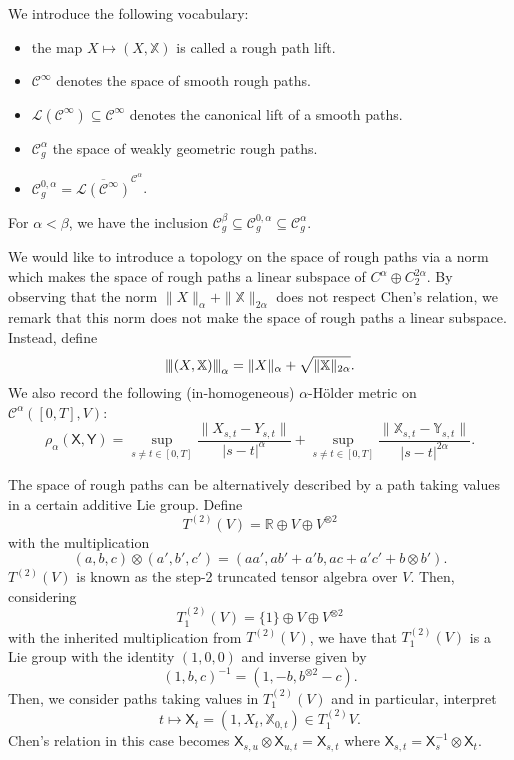 \documentclass[]{article}
\theoremstyle{definition}
\theoremstyle{definition}
\newcommand{\vertiii}[1]{{\left\vert\kern-0.25ex\left\vert\kern-0.25ex\left\vert #1 
    \right\vert\kern-0.25ex\right\vert\kern-0.25ex\right\vert}}
\begin{document}
We introduce the following vocabulary:
\begin{itemize}
  \item the map \(X \mapsto (X, \mathbb{X})\) is called a rough path lift.
  \item \(\mathcal{C}^\infty\) denotes the space of smooth rough paths.
  \item \(\mathcal{L}(\mathcal{C}^\infty) \subseteq \mathcal{C}^\infty\) denotes the canonical lift of a smooth paths.
  \item \(\mathcal{C}^\alpha_g\) the space of weakly geometric rough paths.
  \item \(\mathcal{C}^{0, \alpha}_g = \overline{\mathcal{L}(\mathcal{C}^\infty)}^{\mathcal{C}^\alpha}\).
\end{itemize}

For \(\alpha < \beta\), we have the inclusion \(\mathcal{C}^\beta_g \subseteq \mathcal{C}^{0, \alpha}_g \subseteq \mathcal{C}^\alpha_g\).

We would like to introduce a topology on the space of rough paths via a norm which makes the space of rough paths 
a linear subspace of \(C^\alpha \oplus C_2^{2\alpha}\). By observing that the norm \(\|X\|_{\alpha} + \|\mathbb{X}\|_{2\alpha}\)
does not respect Chen's relation, we remark that this norm does not make the space of rough paths a linear subspace. 
Instead, define 
\[\vertiii{(X, \mathbb{X})}_\alpha = \|X\|_\alpha + \sqrt{\|\mathbb{X}\|_{2\alpha}}.\]
We also record the following (in-homogeneous) \(\alpha\)-H\"older metric on \(\mathcal{C}^\alpha([0, T], V)\):
\[\rho_\alpha(\mathsf{X}, \mathsf{Y}) = \sup_{s \neq t \in [0, T]}\frac{\|X_{s, t} - Y_{s, t}\|}{|s - t|^\alpha} + 
  \sup_{s \neq t \in [0, T]}\frac{\|\mathbb{X}_{s, t} - \mathbb{Y}_{s, t}\|}{|s - t|^{2\alpha}}.\]


The space of rough paths can be alternatively described by a path taking values in a certain additive Lie group. 
Define 
\[T^{(2)}(V) = \mathbb{R} \oplus V \oplus V^{\otimes 2}\]
with the multiplication 
\[(a, b, c) \otimes (a', b', c') = (aa', ab' + a'b, ac + a'c' + b \otimes b').\]
\(T^{(2)}(V)\) is known as the step-2 truncated tensor algebra over \(V\). Then, considering 
\[T^{(2)}_1(V) = \{1\} \oplus V \oplus V^{\otimes 2}\]
with the inherited multiplication from \(T^{(2)}(V)\), we have that \(T^{(2)}_1(V)\) is a Lie group 
with the identity \((1, 0, 0)\) and inverse given by 
\[(1, b, c)^{-1} = (1, -b, b^{\otimes 2} - c).\]
Then, we consider paths taking values in \(T^{(2)}_1(V)\) and in particular, interpret 
\[t \mapsto \mathsf{X}_t = (1, X_t, \mathbb{X}_{0, t}) \in T^{(2)}_1{V}.\]
Chen's relation in this case becomes \(\mathsf{X}_{s, u} \otimes \mathsf{X}_{u, t} = \mathsf{X}_{s, t}\) 
where \(\mathsf{X}_{s, t} = \mathsf{X}_{s}^{-1} \otimes \mathsf{X}_t\).
\end{document}
